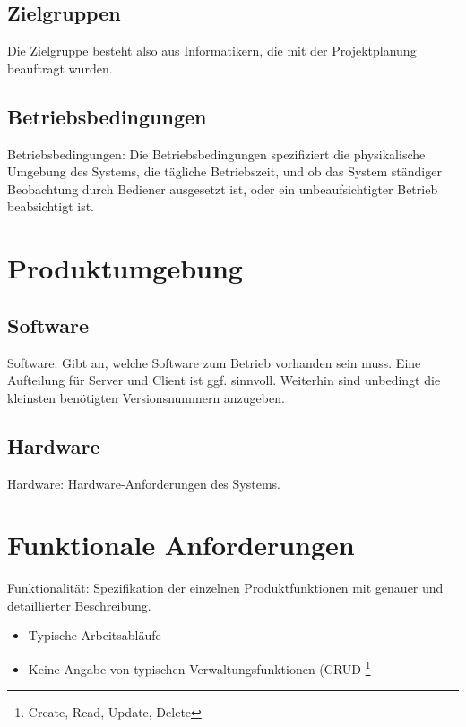 \documentclass[a4paper]{scrreprt}
\begin{document}
        \section{Zielgruppen}
            Die Zielgruppe besteht also aus Informatikern, die mit der Projektplanung
            beauftragt wurden.
 
        \section{Betriebsbedingungen}
            Betriebsbedingungen: Die Betriebsbedingungen spezifiziert die physikalische
            Umgebung des Systems, die tägliche Betriebszeit, und ob das System ständiger
            Beobachtung durch Bediener ausgesetzt ist, oder ein unbeaufsichtigter Betrieb
            beabsichtigt ist.
 
    \chapter{Produktumgebung}
 
        \section{Software}
            Software: Gibt an, welche Software zum Betrieb vorhanden sein muss. Eine
            Aufteilung für Server und Client ist ggf. sinnvoll. Weiterhin sind unbedingt die
            kleinsten benötigten Versionsnummern anzugeben.
 
        \section{Hardware}
            Hardware: Hardware-Anforderungen des Systems.
 
    \chapter{Funktionale Anforderungen}
        Funktionalität: Spezifikation der einzelnen Produktfunktionen mit genauer und
        detaillierter Beschreibung.
 
        \begin{itemize}
            \item Typische Arbeitsabläufe
            \item Keine Angabe von typischen Verwaltungsfunktionen (CRUD \footnote{Create,
                  Read, Update, Delete}
        \end{itemize}
 
\end{document}
